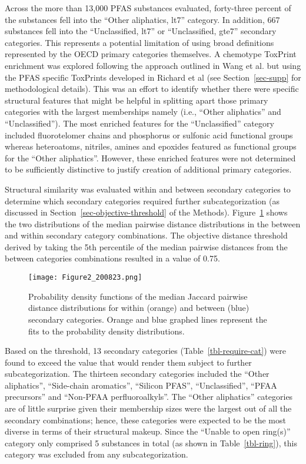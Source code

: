 \documentclass[
  super,
  preprint,
  3p]{elsarticle}
\begin{document}
Across the more than 13,000 PFAS substances evaluated, forty-three
percent of the substances fell into the ``Other aliphatics, lt7''
category. In addition, 667 substances fell into the ``Unclassified,
lt7'' or ``Unclassified, gte7'' secondary categories. This represents a
potential limitation of using broad definitions represented by the OECD
primary categories themselves. A chemotype ToxPrint enrichment was
explored following the approach outlined in Wang et
al.\citep{wang_high-throughput_2019} but using the PFAS specific
ToxPrints developed in Richard et al \citep{richard_new_2023} (see
Section~\ref{sec-supp} for methodological details). This was an effort
to identify whether there were specific structural features that might
be helpful in splitting apart those primary categories with the largest
memberships namely (i.e., ``Other aliphatics'' and ``Unclassified'').
The most enriched features for the ``Unclassified'' category included
fluorotelomer chains and phosphorus or sulfonic acid functional groups
whereas heteroatoms, nitriles, amines and epoxides featured as
functional groups for the ``Other aliphatics''. However, these enriched
features were not determined to be sufficiently distinctive to justify
creation of additional primary categories.

Structural similarity was evaluated within and between secondary
categories to determine which secondary categories required further
subcategorization (as discussed in Section~\ref{sec-objective-threshold}
of the Methods). Figure~\ref{fig-threshold} shows the two distributions
of the median pairwise distance distributions in the between and within
secondary category combinations. The objective distance threshold
derived by taking the 5th percentile of the median pairwise distances
from the between categories combinations resulted in a value of 0.75.

\begin{figure}

{\centering \texttt{[image: Figure2\_200823.png]}

}

\caption{\label{fig-threshold}Probability density functions of the
median Jaccard pairwise distance distributions for within (orange) and
between (blue) secondary categories. Orange and blue graphed lines
represent the fits to the probability density distributions.}

\end{figure}

Based on the threshold, 13 secondary categories
(Table~\ref{tbl-require-cat}) were found to exceed the value that would
render them subject to further subcategorization. The thirteen secondary
categories included the ``Other aliphatics'', ``Side-chain aromatics'',
``Silicon PFAS'', ``Unclassified'', ``PFAA precursors'' and ``Non-PFAA
perfluoroalkyls''. The ``Other aliphatics'' categories are of little
surprise given their membership sizes were the largest out of all the
secondary combinations; hence, these categories were expected to be the
most diverse in terms of their structural makeup. Since the ``Unable to
open ring(s)'' category only comprised 5 substances in total (as shown
in Table~\ref{tbl-ring}), this category was excluded from any
subcategorization.
\end{document}
